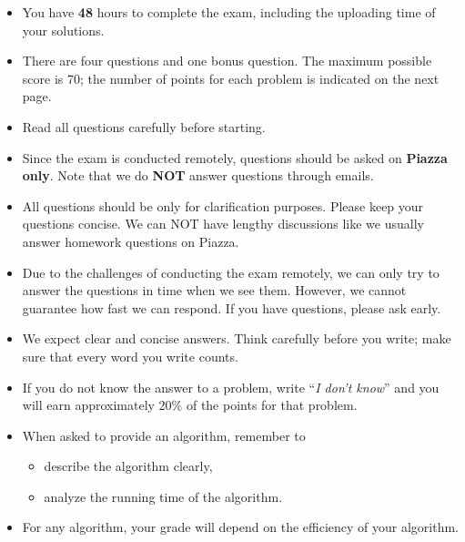 \documentclass[12pt]{amsart}
\begin{document}
\begin{itemize}
\item
You have {\bf 48} hours to complete the exam, including the uploading time of your solutions. 
\item 
There are four questions and one bonus question. The maximum possible score is 70; the number of points for each problem is indicated on the next page.
\item
Read all questions carefully before starting.
\item
Since the exam is conducted remotely, questions should be asked on {\bf Piazza only}. Note that we do {\bf NOT} answer questions through emails. 
\item All questions should be only for clarification purposes. Please keep your questions concise. We can NOT have lengthy discussions like we usually answer homework questions on Piazza.
\item Due to the challenges of conducting the exam remotely, we can only try to answer the questions in time when we see them. However, we cannot guarantee how fast we can respond. If you have questions, please ask early.
\item
We expect clear and concise answers.  Think carefully before you write; make sure that every word you write counts. 
\item
If you do not know the answer to a problem, write ``\emph{I don't know}'' and you will earn approximately 20\% of the points for that problem.
\item
When asked to provide an algorithm, remember to
\begin{itemize}
\item
describe the algorithm clearly,
\item
analyze the running time of the algorithm.
\end{itemize}
\item For any algorithm, your grade will depend on the efficiency of your algorithm.
\end{itemize}
\end{document}
